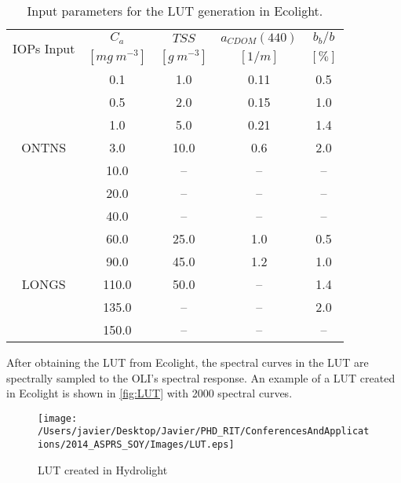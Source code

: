 \begin{table}[htb]
\caption{ Input parameters for the LUT generation in Ecolight. \label{tab:LUTconc2} } 
\centering
		\begin{tabular}{ccccc}
    \hline \hline
    \multirow{2}{*}{IOPs Input} & \bfseries{$C_a$}  	& \bfseries{$TSS$}  & \bfseries{$a_{CDOM}(440)$} & \bfseries{$b_b/b$}\\
		           & $[mg~m^{-3}]$   		& $[g~m^{-3}]$      & 	$[1/m]$                  &	$[\%]$	         \\ \hline \hline
\multirow{7}{*}{ONTNS} & 0.1   & 1.0  &  0.11 &  0.5 \\
                       & 0.5   & 2.0  &  0.15 &  1.0 \\
                       & 1.0   & 5.0  &  0.21 &  1.4 \\
                       & 3.0   & 10.0 &  0.6  &  2.0 \\
                       & 10.0  & --   &  --   &  --  \\
                       & 20.0  & --   &  --   &  --  \\
                       & 40.0  & --   &  --   &  --  \\ \hline

\multirow{5}{*}{LONGS} & 60.0  & 25.0 & 1.0   &  0.5 \\  
                       & 90.0  & 45.0 & 1.2   &  1.0 \\  
                       & 110.0 & 50.0 & --    &  1.4 \\  
                       & 135.0 & --   & --    &  2.0 \\  
                       & 150.0 & --   & --    &  --  \\  \hline \hline    
	 	\end{tabular}
	\end{table}


After obtaining the LUT from Ecolight, the spectral curves in the LUT are spectrally sampled to the OLI's spectral response. An example of a LUT created in Ecolight is shown in \autoref{fig:LUT} with 2000 spectral curves. 

\begin{figure}[htb]
    \centering
      \texttt{[image: /Users/javier/Desktop/Javier/PHD\_RIT/ConferencesAndApplications/2014\_ASPRS\_SOY/Images/LUT.eps]}
      \caption{LUT created in Hydrolight}
      \label{fig:LUT}
\end{figure}

